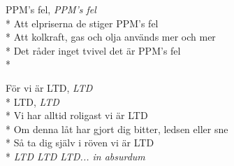 \begin{SongText}
\begin{SongVerse}
    PPM's fel, \textit{PPM's fel}\\*%
    Att elpriserna de stiger PPM's fel\\*%
    Att kolkraft, gas och olja används mer och mer\\*%
    Det råder inget tvivel det är PPM's fel\\*%
\end{SongVerse}
\begin{SongVerse}
    För vi är LTD, \textit{LTD}\\*%
    LTD, \textit{LTD}\\*%
    Vi har alltid roligast vi är LTD\\*%
    Om denna låt har gjort dig bitter, ledsen eller sne\\*%
    Så ta dig själv i röven vi är LTD\\*%
    \textit{LTD LTD LTD... in absurdum}
\end{SongVerse}
\end{SongText}

